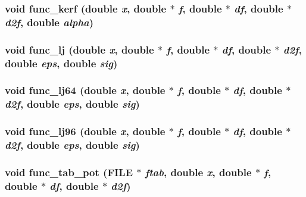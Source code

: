 \subsubsection{\setlength{\rightskip}{0pt plus 5cm}void func\_\-kerf (double {\em x}, double $\ast$ {\em f}, double $\ast$ {\em df}, double $\ast$ {\em d2f}, double {\em alpha})}\label{test_2dzug_2md__funcvdw_8c_9f26633326767e1cb68aee990bfca52c}


\subsubsection{\setlength{\rightskip}{0pt plus 5cm}void func\_\-lj (double {\em x}, double $\ast$ {\em f}, double $\ast$ {\em df}, double $\ast$ {\em d2f}, double {\em eps}, double {\em sig})}\label{test_2dzug_2md__funcvdw_8c_381d91bc068f2d5bc05af1a4587f5bf5}


\subsubsection{\setlength{\rightskip}{0pt plus 5cm}void func\_\-lj64 (double {\em x}, double $\ast$ {\em f}, double $\ast$ {\em df}, double $\ast$ {\em d2f}, double {\em eps}, double {\em sig})}\label{test_2dzug_2md__funcvdw_8c_f8bee3d3aac582186dcaab89214e6d84}


\subsubsection{\setlength{\rightskip}{0pt plus 5cm}void func\_\-lj96 (double {\em x}, double $\ast$ {\em f}, double $\ast$ {\em df}, double $\ast$ {\em d2f}, double {\em eps}, double {\em sig})}\label{test_2dzug_2md__funcvdw_8c_5ec21b9c2a409d126611530ccc921ed4}


\subsubsection{\setlength{\rightskip}{0pt plus 5cm}void func\_\-tab\_\-pot (FILE $\ast$ {\em ftab}, double {\em x}, double $\ast$ {\em f}, double $\ast$ {\em df}, double $\ast$ {\em d2f})}\label{test_2dzug_2md__funcvdw_8c_80ef4480b418d557b240d066da1f7b80}


